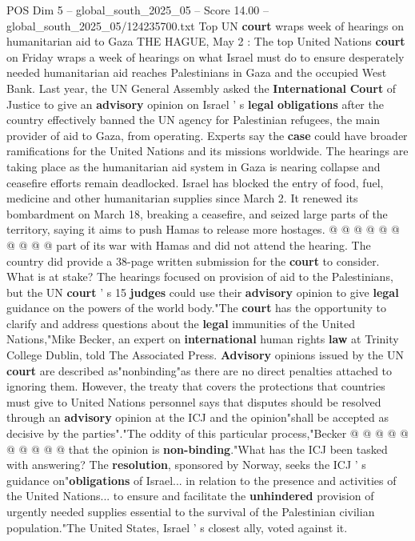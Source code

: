 \begin{textsample}{POS Dim 5 – global\_south\_2025\_05 – Score 14.00 – global\_south\_2025\_05/124235700.txt}  \label{ex:f5_pos_198}
Top UN \textbf{court} wraps week of hearings on humanitarian aid to Gaza THE HAGUE, May 2 : The top United Nations \textbf{court} on Friday wraps a week of hearings on what Israel must do to ensure desperately needed humanitarian aid reaches Palestinians in Gaza and the occupied West Bank.
Last year, the UN General Assembly asked the \textbf{International} \textbf{Court} of Justice to give an \textbf{advisory} opinion on Israel ' s \textbf{legal} \textbf{obligations} after the country effectively banned the UN agency for Palestinian refugees, the main provider of aid to Gaza, from operating.
Experts say the \textbf{case} could have broader ramifications for the United Nations and its missions worldwide.
The hearings are taking place as the humanitarian aid system in Gaza is nearing collapse and ceasefire efforts remain deadlocked.
Israel has blocked the entry of food, fuel, medicine and other humanitarian supplies since March 2.
It renewed its bombardment on March 18, breaking a ceasefire, and seized large parts of the territory, saying it aims to push Hamas to release more hostages. @ @ @ @ @ @ @ @ @ @ part of its war with Hamas and did not attend the hearing.
The country did provide a 38-page written submission for the \textbf{court} to consider.
What is at stake?
The hearings focused on provision of aid to the Palestinians, but the UN \textbf{court} ' s 15 \textbf{judges} could use their \textbf{advisory} opinion to give \textbf{legal} guidance on the powers of the world body."The \textbf{court} has the opportunity to clarify and address questions about the \textbf{legal} immunities of the United Nations,"Mike Becker, an expert on \textbf{international} human rights \textbf{law} at Trinity College Dublin, told The Associated Press. \textbf{Advisory} opinions issued by the UN \textbf{court} are described as"nonbinding"as there are no direct penalties attached to ignoring them.
However, the treaty that covers the protections that countries must give to United Nations personnel says that disputes should be resolved through an \textbf{advisory} opinion at the ICJ and the opinion"shall be accepted as decisive by the parties"."The oddity of this particular process,"Becker @ @ @ @ @ @ @ @ @ @ that the opinion is \textbf{non-binding}."What has the ICJ been tasked with answering?
The \textbf{resolution}, sponsored by Norway, seeks the ICJ ' s guidance on"\textbf{obligations} of Israel... in relation to the presence and activities of the United Nations... to ensure and facilitate the \textbf{unhindered} provision of urgently needed supplies essential to the survival of the Palestinian civilian population."The United States, Israel ' s closest ally, voted against it.

\end{textsample}
